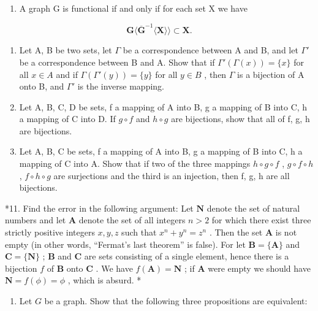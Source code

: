 \begin{enumerate}
\def\labelenumi{\arabic{enumi}.}
\setcounter{enumi}{6}
\tightlist
\item
  A graph G is functional if and only if for each set X we have
\end{enumerate}

\[
\mathbf {G} \langle \overline {{\mathbf {G}}} ^ {- 1} \langle \mathbf {X} \rangle \rangle \subset \mathbf {X}.
\]

\begin{enumerate}
\def\labelenumi{\arabic{enumi}.}
\setcounter{enumi}{7}
\item
  Let A, B be two sets, let \(\Gamma\) be a correspondence between A and B, and let \(\Gamma'\) be a correspondence between B and A. Show that if \(\Gamma'(\Gamma(x)) = \{x\}\) for all \(x \in A\) and if \(\Gamma(\Gamma'(y)) = \{y\}\) for all \(y \in B\) , then \(\Gamma\) is a bijection of A onto B, and \(\Gamma'\) is the inverse mapping.
\item
  Let A, B, C, D be sets, f a mapping of A into B, g a mapping of B into C, h a mapping of C into D. If \(g \circ f\) and \(h \circ g\) are bijections, show that all of f, g, h are bijections.
\item
  Let A, B, C be sets, f a mapping of A into B, g a mapping of B into C, h a mapping of C into A. Show that if two of the three mappings \(h \circ g \circ f\) , \(g \circ f \circ h\) , \(f \circ h \circ g\) are surjections and the third is an injection, then f, g, h are all bijections.
\end{enumerate}

*11. Find the error in the following argument: Let \(\mathbf{N}\) denote the set of natural numbers and let \(\mathbf{A}\) denote the set of all integers \(n > 2\) for which there exist three strictly positive integers \(x, y, z\) such that \(x^n + y^n = z^n\) . Then the set \(\mathbf{A}\) is not empty (in other words, ``Fermat's last theorem'' is false). For let \(\mathbf{B} = \{\mathbf{A}\}\) and \(\mathbf{C} = \{\mathbf{N}\}\) ; \(\mathbf{B}\) and \(\mathbf{C}\) are sets consisting of a single element, hence there is a bijection \(f\) of \(\mathbf{B}\) onto \(\mathbf{C}\) . We have \(f(\mathbf{A}) = \mathbf{N}\) ; if \(\mathbf{A}\) were empty we should have \(\mathbf{N} = f(\phi) = \phi\) , which is absurd. *

\exercisegroup

\begin{enumerate}
\def\labelenumi{\arabic{enumi}.}
\tightlist
\item
  Let \(G\) be a graph. Show that the following three propositions are equivalent:
\end{enumerate}

